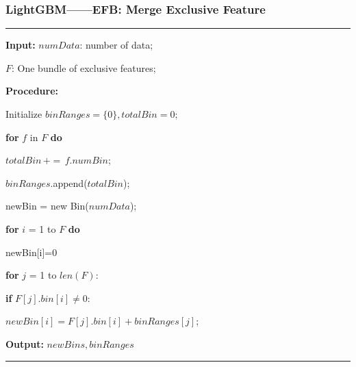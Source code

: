 \documentclass[usenames,dvipsnames]{beamer}
\begin{document}
\begin{frame}
\frametitle{LightGBM——EFB: Merge Exclusive Feature}
\noindent\rule[0.10\baselineskip]{\textwidth}{0.75pt}
    \textbf{Input:} $numData$: number of data;\par
    \hspace*{32pt} $F$: One bundle of exclusive features;\par
    \textbf{Procedure:}\par
    \hspace*{32pt} Initialize $binRanges = \{0\}, totalBin = 0$;\par
    \hspace*{32pt} \textbf{for} $f$ in $F$ \textbf{do}\par
    \hspace*{48pt}  $totalBin\, +=\, f.numBin$;\par
    \hspace*{48pt}  $binRanges$.append($totalBin$);\par
    \hspace*{32pt}  newBin = new Bin($numData$);\par
    \hspace*{32pt}  \textbf{for} $i$ = 1 to $F$ \textbf{do}\par
    \hspace*{48pt}  newBin[i]=0\par
    \hspace*{48pt}  \textbf{for} $j$ = 1 to $len(F)$:\par
    \hspace*{64pt}  \textbf{if} $F[j].bin[i]\neq 0$:\par
    \hspace*{80pt}  $newBin[i] = F[j].bin[i]+binRanges[j]$;\par
    \textbf{Output:} $newBins, binRanges$\par
\noindent\rule[0.10\baselineskip]{\textwidth}{0.75pt}\par
\end{frame}
\end{document}
